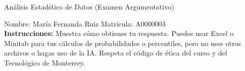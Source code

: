 \documentclass[8pt]{report}
\begin{document}
\newpage



\begin{center}
{An\'alisis Estad\'stico de Datos (Examen Argumentativo)}
\end{center}

Nombre: \underline{\hspace*{.2in}}
María Fernanda Ruiz
\underline{\hspace*{.2in}} \quad Matr\'icula:\underline{\hspace*{.2in}}
A0000003
\underline{\hspace*{.2in}} \\

{\bf Instrucciones:} Muestra c\'omo obtienes tu respuesta. Puedes usar Excel 
o Minitab para tus cálculos de probabilidades o 
percentiles, pero no uses otros archivos o hagas uso de la IA. Respeta el 
c\'odigo de \'etica del curso y del Tecnol\'ogico 
de Monterrey.
\end{document}
